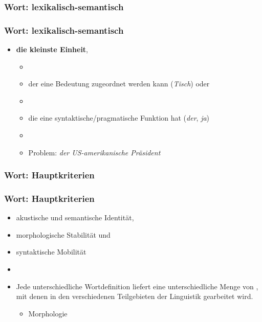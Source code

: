 \subsubsection{Wort: lexikalisch-semantisch}


\begin{frame}
\frametitle{Wort: lexikalisch-semantisch}

\begin{itemize}
	\item \textbf{die kleinste Einheit},
	
	\begin{itemize}
		\item[]
		\item der eine Bedeutung zugeordnet werden kann (\emph{Tisch}) oder
		\item[]		
		\item die eine syntaktische/pragmatische Funktion hat (\emph{der}, \emph{ja})
		\item[]
		\item Problem: \emph{der US-amerikanische Präsident}
	\end{itemize}
\end{itemize}


\end{frame}


\subsubsection{Wort: Hauptkriterien}


\begin{frame}
\frametitle{Wort: Hauptkriterien}

\begin{itemize}
	\item akustische und semantische Identität,
	\item morphologische Stabilität und
	\item syntaktische Mobilität
	\item[]
	\item Jede unterschiedliche Wortdefinition liefert eine unterschiedliche Menge von , mit denen in den verschiedenen Teilgebieten der Linguistik gearbeitet wird.
	
	\begin{itemize}
		\item Morphologie \ras {}
	\end{itemize}
\end{itemize}


\end{frame}


